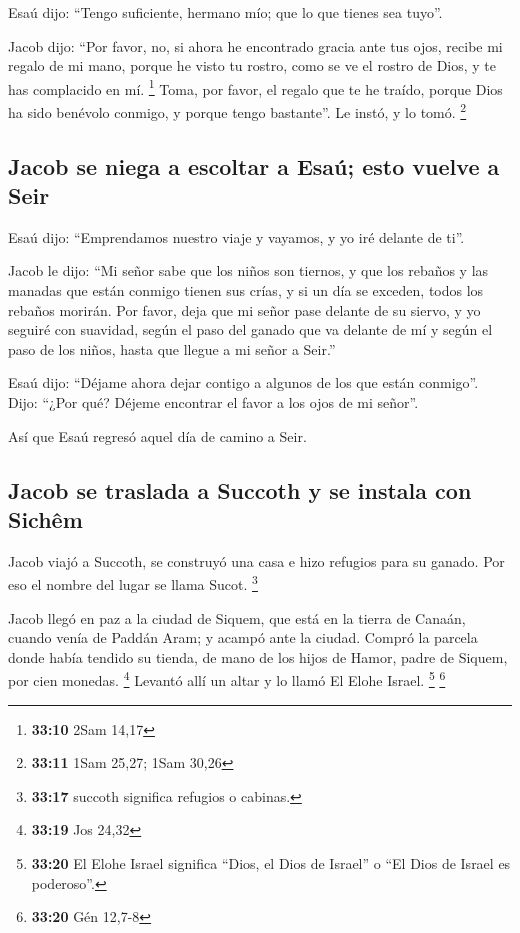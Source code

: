  Esaú dijo: ``Tengo suficiente, hermano mío; que lo que
tienes sea tuyo''.

 Jacob dijo: ``Por favor, no, si ahora he encontrado
gracia ante tus ojos, recibe mi regalo de mi mano, porque he visto tu
rostro, como se ve el rostro de Dios, y te has complacido en mí.
\footnote{\textbf{33:10} 2Sam 14,17}  Toma, por favor, el
regalo que te he traído, porque Dios ha sido benévolo conmigo, y porque
tengo bastante''. Le instó, y lo tomó. \footnote{\textbf{33:11} 1Sam
  25,27; 1Sam 30,26}

\hypertarget{jacob-se-niega-a-escoltar-a-esauxfa-esto-vuelve-a-seir}{%
\subsection{Jacob se niega a escoltar a Esaú; esto vuelve a
Seir}\label{jacob-se-niega-a-escoltar-a-esauxfa-esto-vuelve-a-seir}}

 Esaú dijo: ``Emprendamos nuestro viaje y vayamos, y yo
iré delante de ti''.

 Jacob le dijo: ``Mi señor sabe que los niños son
tiernos, y que los rebaños y las manadas que están conmigo tienen sus
crías, y si un día se exceden, todos los rebaños morirán.
 Por favor, deja que mi señor pase delante de su siervo,
y yo seguiré con suavidad, según el paso del ganado que va delante de mí
y según el paso de los niños, hasta que llegue a mi señor a Seir.''

 Esaú dijo: ``Déjame ahora dejar contigo a algunos de los
que están conmigo''. Dijo: ``¿Por qué? Déjeme encontrar el favor a los
ojos de mi señor''.

 Así que Esaú regresó aquel día de camino a Seir.

\hypertarget{jacob-se-traslada-a-succoth-y-se-instala-con-sichuxeam}{%
\subsection{Jacob se traslada a Succoth y se instala con
Sichêm}\label{jacob-se-traslada-a-succoth-y-se-instala-con-sichuxeam}}

 Jacob viajó a Succoth, se construyó una casa e hizo
refugios para su ganado. Por eso el nombre del lugar se llama Sucot.
\footnote{\textbf{33:17} succoth significa refugios o cabinas.}

 Jacob llegó en paz a la ciudad de Siquem, que está en la
tierra de Canaán, cuando venía de Paddán Aram; y acampó ante la ciudad.
 Compró la parcela donde había tendido su tienda, de mano
de los hijos de Hamor, padre de Siquem, por cien monedas. \footnote{\textbf{33:19}
  Jos 24,32}  Levantó allí un altar y lo llamó El Elohe
Israel. \footnote{\textbf{33:20} El Elohe Israel significa ``Dios, el
  Dios de Israel'' o ``El Dios de Israel es poderoso''.} \footnote{\textbf{33:20}
  Gén 12,7-8}

